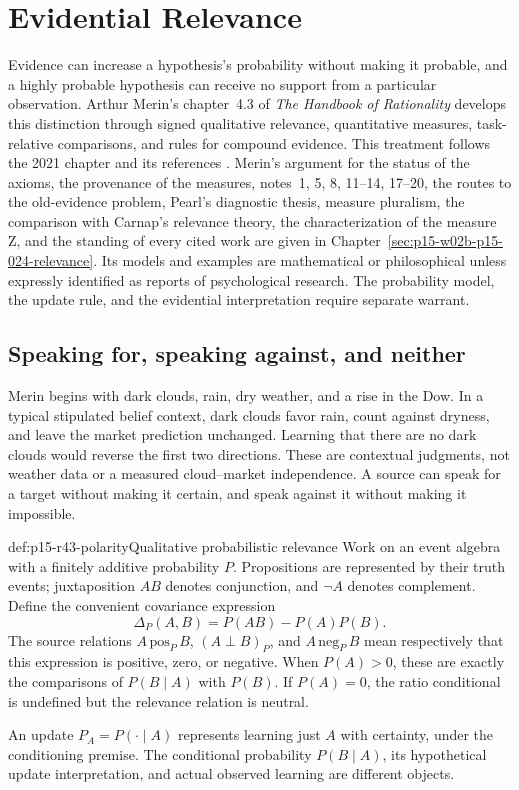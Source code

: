 \chapter{Evidential Relevance}
\label{sec:p15-rationality-4-3}

Evidence can increase a hypothesis's probability without making it probable,
and a highly probable hypothesis can receive no support from a particular
observation. Arthur Merin's chapter~4.3 of \emph{The Handbook of Rationality}
develops this distinction through signed qualitative relevance, quantitative
measures, task-relative comparisons, and rules for compound evidence.
This treatment follows the 2021 chapter and its references
\parencite[pp.~265--275]{Merin2021Relevance}. Merin's argument for the
status of the axioms, the provenance of the measures, notes~1, 5, 8, 11--14,
17--20, the routes to the old-evidence problem, Pearl's diagnostic thesis,
measure pluralism, the comparison with Carnap's relevance theory, the
characterization of the measure Z, and the standing of every cited work are given in
Chapter~\ref{sec:p15-w02b-p15-024-relevance}.
Its models and examples are mathematical or philosophical unless expressly
identified as reports of psychological research. The probability model,
the update rule, and the evidential interpretation require separate warrant.

\section{Speaking for, speaking against, and neither}
\label{sec:p15-r43-qualitative}

Merin begins with dark clouds, rain, dry weather, and a rise in the Dow.
In a typical stipulated belief context, dark clouds favor rain, count
against dryness, and leave the market prediction unchanged. Learning
that there are no dark clouds would reverse the first two directions.
These are contextual judgments, not weather data or a measured
cloud--market independence. A source can speak for a target without
making it certain, and speak against it without making it impossible.

\begin{hbdefinition}{def:p15-r43-polarity}{Qualitative probabilistic relevance}
Work on an event algebra with a finitely additive probability \(P\).
Propositions are represented by their truth events; juxtaposition
\(AB\) denotes conjunction, and \(\neg A\) denotes complement.
Define the convenient covariance expression
\[
             \Delta_P(A,B)=P(AB)-P(A)P(B).
\]
The source relations \(A\,\mathrm{pos}_P\,B\), \((A\perp B)_P\), and
\(A\,\mathrm{neg}_P\,B\) mean respectively that this expression is
positive, zero, or negative. When \(P(A)>0\), these are exactly the
comparisons of \(P(B\mid A)\) with \(P(B)\). If \(P(A)=0\), the
ratio conditional is undefined but the relevance relation is neutral.

An update \(P_A=P(\cdot\mid A)\) represents learning just \(A\) with
certainty, under the conditioning premise. The conditional probability
\(P(B\mid A)\), its hypothetical update interpretation, and actual
observed learning are different objects.
\end{hbdefinition}

